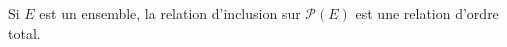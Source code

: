 Si $E$ est un ensemble, la relation d'inclusion sur $\mathcal P(E)$ est une relation d'ordre total.

\begin{reponses}
\end{reponses}

